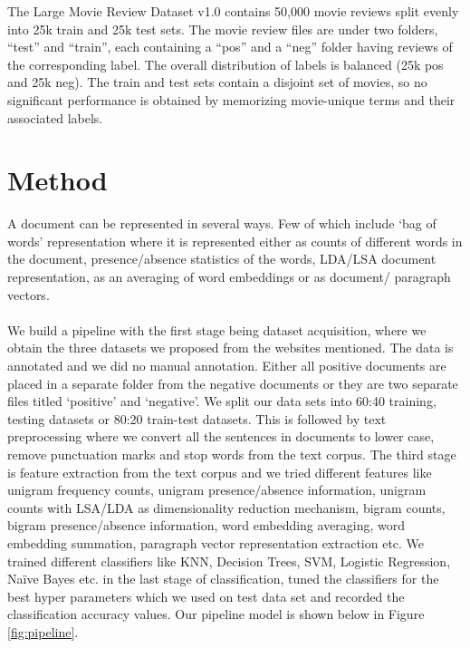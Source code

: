 \documentclass[a4paper,26pt]{article}
\begin{document}
The Large Movie Review Dataset v1.0 contains 50,000 movie reviews split evenly into 25k train and 25k test sets. The movie review files are under two folders, ``test'' and ``train'', each containing a ``pos'' and a ``neg'' folder having reviews of the corresponding label. The overall distribution of labels is balanced (25k pos and 25k neg). The train and test sets contain a disjoint set of movies, so no significant performance is obtained by memorizing movie-unique terms and their associated labels.

\section{Method}
A document can be represented in several ways. Few of which include `bag of words' representation where it is represented either as counts of different words in the document, presence/absence statistics of the words, LDA/LSA document representation, as an averaging of word embeddings or as document/ paragraph vectors.

\paragraph{}
We build a pipeline with the first stage being dataset acquisition, where we obtain the three datasets we proposed from the websites mentioned. The data is annotated and we did no manual annotation. Either all positive documents are placed in a separate folder from the negative documents or they are two separate files titled `positive' and `negative'. We split our data sets into 60:40 training, testing datasets or 80:20 train-test datasets. This is followed by text preprocessing where we convert all the sentences in documents to lower case, remove punctuation marks and stop words from the text corpus. The third stage is feature extraction from the text corpus and we tried different features like unigram frequency counts, unigram presence/absence information, unigram counts with LSA/LDA as dimensionality reduction mechanism, bigram counts, bigram presence/absence information, word embedding averaging, word embedding summation, paragraph vector representation extraction etc. We trained different classifiers like KNN, Decision Trees, SVM, Logistic Regression, Na\"{i}ve Bayes etc. in the last stage of classification, tuned the classifiers for the best hyper parameters which we used on test data set and recorded the classification accuracy values. 
Our pipeline model is shown below in Figure \ref{fig:pipeline}.
\end{document}
